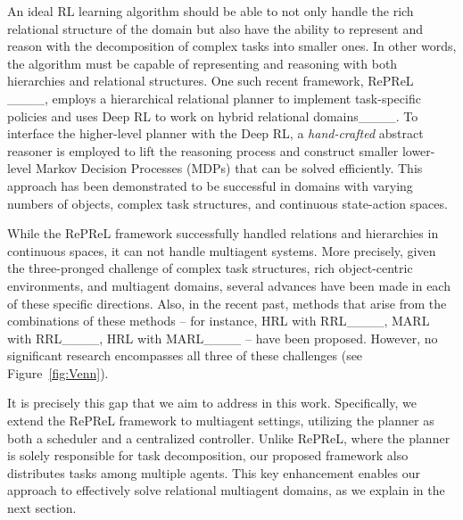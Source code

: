 An ideal RL learning algorithm should be able to not only handle the rich relational structure of the domain but also have the ability to represent and reason with the decomposition of complex tasks into smaller ones. In other words, the algorithm must be capable of representing and reasoning with both hierarchies and relational structures. 
One such recent framework, RePReL ____, employs a hierarchical relational planner to implement task-specific policies and uses Deep RL to work on hybrid relational domains____. To interface the higher-level planner with the Deep RL, a {\em hand-crafted} abstract reasoner is employed to lift the reasoning process and construct smaller lower-level Markov Decision Processes (MDPs) that can be solved efficiently. This approach has been demonstrated to be successful in domains with varying numbers of objects, complex task structures, and continuous state-action spaces. 

While the RePReL framework successfully handled relations and hierarchies in continuous spaces, it can not handle multiagent systems. More precisely, given the three-pronged challenge of complex task structures, rich object-centric environments, and multiagent 
domains, several advances have been made in each of these specific directions. Also, in the recent past, methods that arise from the combinations of these methods -- for instance, HRL with RRL____, MARL with RRL____, HRL with MARL____ -- have been proposed. However, no significant research encompasses all three of these challenges (see Figure~\ref{fig:Venn}).

It is precisely this gap that we aim to address in this work. Specifically, we extend the RePReL framework to multiagent settings, utilizing the planner as both a scheduler and a centralized controller. Unlike RePReL, where the planner is solely responsible for task decomposition, our proposed framework also distributes tasks among multiple agents. This key enhancement enables our approach to effectively solve relational multiagent domains, as we explain in the next section.